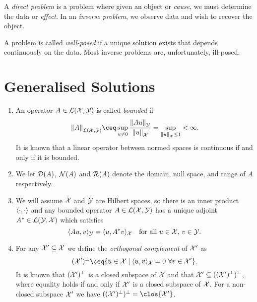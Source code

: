 \begin{mdframed}
A \emph{direct problem} is a problem where given an object or \emph{cause}, we must determine the data or \emph{effect}. In an \emph{inverse problem}, we observe data and wish to recover the object. 

A problem is called \emph{well-posed} if a unique solution exists that depends continuously on the data. Most inverse problems are, unfortunately, ill-posed. 
\end{mdframed}

\section{Generalised Solutions}
\begin{recap}
    \begin{enumerate}
        \item     An operator $A \in \mathcal L(\mathcal X, \mathcal Y)$ is called \emph{bounded} if
        \[
        \norm{A}_{\LLL(\XXX, \YYY)} \ceq \sup_{u \neq 0} \frac{\norm{Au}_\YYY}{\norm{u}_\XXX} = \sup_{\norm{u}_\XXX \leq 1} < \infty. 
        \]
            It is known that a linear operator between normed spaces is continuous if and only if it is bounded. 
            \item 
        We let $\operatorname{\mathcal D}(A)$, $\operatorname{\mathcal N}(A)$ and  $\operatorname{\mathcal R}(A)$ denote the domain, null space, and range of $A$ respectively. 
        
        \item     We will assume $\mathcal X$ and $\mathcal Y$ are Hilbert spaces, so there is an inner product $\langle\cdot, \cdot\rangle$ and any bounded operator $A \in \mathcal L(\mathcal X, \mathcal Y)$ has a unique adjoint $A^* \in \mathcal L(\mathcal Y, \mathcal X)$ which satisfies
        \[
        \langle Au, v\rangle_\mathcal Y = \langle u, A^* v\rangle_\mathcal X \quad\text{for all $u \in \mathcal X$, $v \in \mathcal Y$.}
        \]
        
        \item For any $\mathcal X' \subseteq \mathcal X$ we define the \emph{orthogonal complement} of $\mathcal X'$ as
        \[
        (\XXX')\P \ceq \qty{u \in \XXX \mid \ang{u, v}_\XXX = 0 \ \forall v \in \XXX'}. 
        \]
        It is known that $(\mathcal X')^\perp$ is a closed subspace of $\mathcal X$ and that $\mathcal X' \subseteq ((\mathcal X')^\perp)^\perp$, where equality holds if and only if $\mathcal X'$ is a closed subspace of $\mathcal X$. For a non-closed subspace $\mathcal X'$ we have $((\XXX')\P)\P = \clos{\XXX'}$. 
        

\end{enumerate}
\end{recap}
